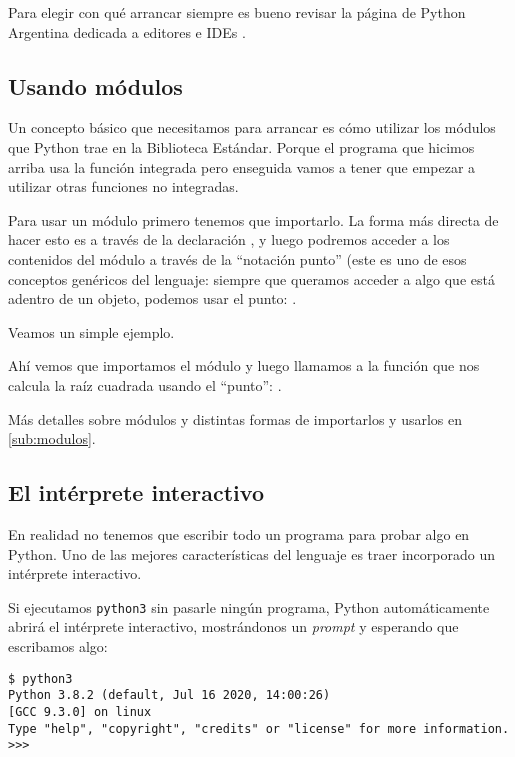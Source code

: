 Para elegir con qué arrancar siempre es bueno revisar la página de Python Argentina dedicada a editores e IDEs \cite{pyar_ides}.


\subsection{Usando módulos}\label{sub:intromods}

Un concepto básico que necesitamos para arrancar es cómo utilizar los módulos que Python trae en la Biblioteca Estándar. Porque el programa que hicimos arriba usa la función integrada  pero enseguida vamos a tener que empezar a utilizar otras funciones no integradas.

Para usar un módulo primero tenemos que importarlo. La forma más directa de hacer esto es a través de la declaración , y luego podremos acceder a los contenidos del módulo a través de la ``notación punto'' (este es uno de esos conceptos genéricos del lenguaje: siempre que queramos acceder a algo que está adentro de un objeto, podemos usar el punto: .

Veamos un simple ejemplo. 


Ahí vemos que importamos el módulo  y luego llamamos a la función que nos calcula la raíz cuadrada usando el ``punto'': .

Más detalles sobre módulos y distintas formas de importarlos y usarlos en \ref{sub:modulos}.


\subsection{El intérprete interactivo}

En realidad no tenemos que escribir todo un programa para probar algo en Python. Uno de las mejores características del lenguaje es traer incorporado un intérprete interactivo.

Si ejecutamos \texttt{python3} sin pasarle ningún programa, Python automáticamente abrirá el intérprete interactivo, mostrándonos un \textit{prompt} y esperando que escribamos algo:

\begin{verbatim}
$ python3
Python 3.8.2 (default, Jul 16 2020, 14:00:26) 
[GCC 9.3.0] on linux
Type "help", "copyright", "credits" or "license" for more information.
>>> 
\end{verbatim}


